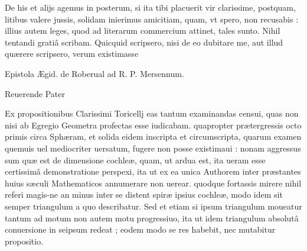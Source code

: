 \documentclass[11pt,a4paper]{article}
\begin{document}
De his et alijs agemus in posterum, si ita tibi placuerit vir clarissime, postquam, litibus valere jussis, solidam inierimus amicitiam, quam, vt spero, non recusabis : illius autem leges, quod ad literarum commercium attinet, tales sunto. Nihil tentandi gratiâ scribam. Quicquid scripsero, nisi de eo dubitare me, aut illud quærere scripsero, verum existimasse


Epistola Ægid.  de Roberual ad R. P. Mersennum.

Reuerende Pater

Ex propositionibus Clarissimi Toricellj eas tantum examinandas censui, quas non nisi ab Egregio Geometra profectas esse iudicabam. quapropter prætergressis octo primis circa Sphæram, et solida eidem inscripta et circumscripta, quarum examen quemuis uel mediocriter uersatum, fugere non posse existimaui : nonam aggressus sum quæ est de dimensione cochleæ, quam, ut ardua est, ita ueram esse certissimâ demonstratione perspexi, ita ut ex ea unica Authorem inter præstantes huius sæculi Mathematicos annumerare non uerear. quodque fortassis mirere nihil referi magis-ne an minus inter se distent spiræ ipsius cochleæ, modo idem sit semper triangulum a quo describatur. Sed et etiam si ipsum triangulum moueatur tantum ad motum  non autem motu progressiuo, ita ut idem triangulum absolutâ conuersione in seipsum redeat ; eodem modo se res habebit, nec mutabitur propositio.
\end{document}
